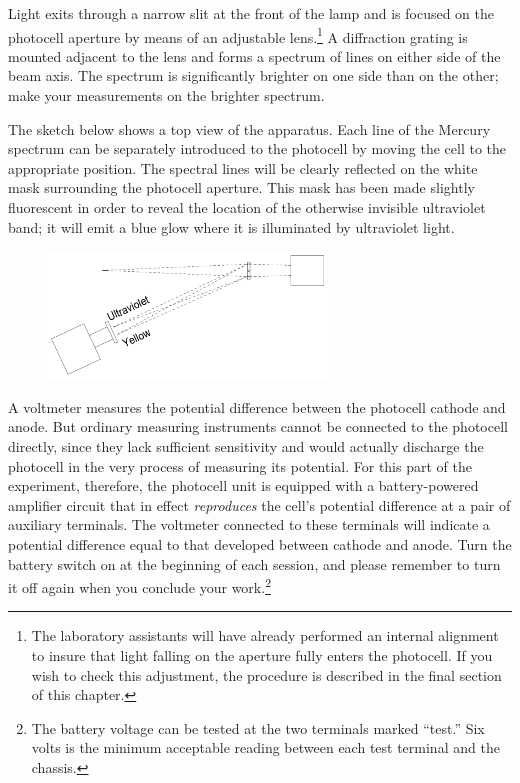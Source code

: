 Light exits through a narrow slit at the front of the lamp and is focused on
the photocell aperture by means of an adjustable lens.\footnote{The
  laboratory assistants will have already performed an internal
  alignment to insure that light falling on the aperture fully enters
  the photocell. If you wish to check this adjustment, the procedure is
  described in the final section of this chapter.} A diffraction grating is mounted adjacent to
the lens and forms a spectrum of lines on either side of the beam axis.
The spectrum is significantly brighter on one side than on the other;
make your measurements on the brighter spectrum.

The sketch below shows a top view of the apparatus. Each line of the
Mercury spectrum can be separately introduced to the photocell by moving
the cell to the appropriate position. The spectral lines will be clearly
reflected on the white mask surrounding the photocell aperture. This
mask has been made slightly fluorescent in order to reveal the location
of the otherwise invisible ultraviolet band; it will emit a blue glow
where it is illuminated by ultraviolet light.

\begin{figure}[h]
  \begin{center}
  \includegraphics[width=2.91667in,height=1.33333in]{images/06_einstein/005.png}
  \end{center}
\end{figure}


A voltmeter measures the potential difference between the photocell
cathode and anode. But ordinary measuring instruments cannot be
connected to the photocell directly, since they lack sufficient
sensitivity and would actually discharge the photocell in the very
process of measuring its potential. For this part of the experiment,
therefore, the photocell unit is equipped with a battery-powered
amplifier circuit that in effect \emph{reproduces} the cell's potential
difference at a pair of auxiliary terminals. The voltmeter connected to
these terminals will indicate a potential difference equal to that
developed between cathode and anode. Turn the battery switch on at the
beginning of each session, and please remember to turn it off again when
you conclude your work.\footnote{The battery voltage can be tested at
  the two terminals marked ``test.'' Six volts is the minimum acceptable
  reading between each test terminal and the chassis.}

